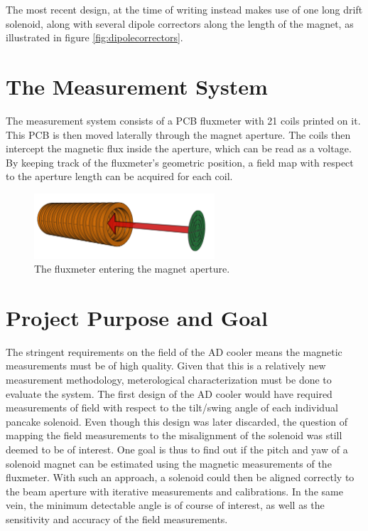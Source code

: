 The most recent design, at the time of writing instead makes use of
one long drift solenoid, along with several dipole correctors along the
length of the magnet, as illustrated in figure \ref{fig:dipolecorrectors}.

\section{The Measurement System}
The measurement system consists of a PCB fluxmeter with 21 coils printed on it.
This PCB is then moved laterally through the magnet aperture.
The coils then intercept the magnetic flux inside the aperture,
which can be read as a voltage. By keeping track of the fluxmeter's
geometric position, a field map with respect to the aperture length
can be acquired for each coil.

\begin{figure}[!h]
    \centering
    \includegraphics[width=0.6\textwidth]{figs/pcbpath}
    \caption{The fluxmeter entering the magnet aperture.}
    \label{fig:pcbpath}
\end{figure}

\section{Project Purpose and Goal}
\label{sec:project_purpose}
The stringent requirements on the field of the AD cooler means the
magnetic measurements must be of high quality. Given that this is
a relatively new measurement methodology, meterological characterization
must be done to evaluate the system. The first design of the AD cooler
would have required measurements of field with respect to the tilt/swing
angle of each individual pancake solenoid. Even though this design was
later discarded, the question of mapping the field measurements to
the misalignment of the solenoid was still deemed to be of interest.
One goal is thus to find out if the pitch and yaw of a solenoid magnet
can be estimated using the magnetic measurements of the fluxmeter.
With such an approach, a solenoid could then be aligned correctly
to the beam aperture with iterative measurements and calibrations.
In the same vein, the minimum detectable angle is of course of interest,
as well as the sensitivity and accuracy of the field measurements.


